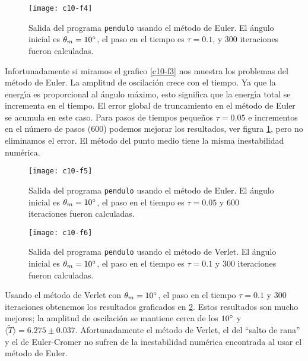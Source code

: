 \begin{figure}[!h]
\begin{center}
\texttt{[image: c10-f4]}
\caption{Salida del programa {\tt pendulo} usando el m{\'e}todo de
  Euler. El {\'a}ngulo inicial es $\theta_m=10^\circ$, el paso en el tiempo es
  $\tau=0.1$, y 300 iteraciones fueron calculadas.}\label{c10-f4}
\end{center}
\end{figure}

Infortunadamente si miramos el grafico \ref{c10-f3} nos muestra los
problemas del m{\'e}todo de Euler. La amplitud de oscilaci{\'o}n crece con el
tiempo. Ya que la energ{\'\i}a es proporcional al {\'a}ngulo m{\'a}ximo, esto
significa que la energ{\'\i}a total se incrementa en el tiempo. El error
global de truncamiento en el m{\'e}todo de Euler se acumula en este caso.
Para pasos de tiempos peque{\~n}os $\tau=0.05$ e incrementos en el n{\'u}mero de
pasos (600) podemos mejorar los resultados, ver figura \ref{c10-f4},
pero no eliminamos el error. El m{\'e}todo del punto medio tiene la misma
inestabilidad num{\'e}rica.

\begin{figure}[!h]
\begin{center}
\texttt{[image: c10-f5]}
\caption{Salida del programa {\tt pendulo} usando el m{\'e}todo de
  Euler. El {\'a}ngulo inicial es $\theta_m=10^\circ$, el paso en el tiempo es
  $\tau=0.05$ y 600 iteraciones fueron calculadas.}\label{c10-f5}
\end{center}
\end{figure}

\begin{figure}[!h]
\begin{center}
\texttt{[image: c10-f6]}
\caption{Salida del programa {\tt pendulo} usando el m{\'e}todo de
  Verlet. El {\'a}ngulo inicial es $\theta_m=10^\circ$, el paso en el tiempo es
  $\tau=0.1$ y 300 iteraciones fueron calculadas.}\label{c10-f6}
\end{center}
\end{figure}

Usando el m{\'e}todo de Verlet con $\theta_m=10^\circ$, el paso en el tiempo
$\tau=0.1$ y 300 iteraciones obtenemos los resultados graficados en
\ref{c10-f5}. Estos resultados son mucho mejores; la amplitud de
oscilaci{\'o}n se mantiene cerca de los $10^\circ$ y $\langle \tilde
T\rangle=6.275\pm0.037$. Afortunadamente el m{\'e}todo de Verlet, el del ``salto
de rana'' y el de Euler-Cromer no sufren de la inestabilidad num{\'e}rica
encontrada al usar el m{\'e}todo de Euler.

